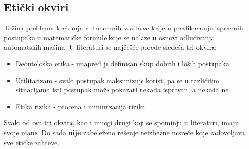 \documentclass[a4paper]{article}
\begin{document}
\subsection{Etički okviri}
\label{subsec:Etički okviri}
Težina problema kreiranja autonomnih vozila se krije u preslikavanju ispravnih postupaka u matematičke formule koje se nalaze u osnovi odlučivanja automatskih mašina. U literaturi se najčešće porede sledeća tri okvira:
\begin{itemize}
 \item {Deontološka etika - unapred je definisan skup dobrih i loših postupaka}
 \item {Utilitarizam - svaki postupak maksimizuje korist, pa se u različitim              situacijama isti postupak može pokazati nekada ispravan, a nekada ne }
 \item {Etika rizika - procena i minimizacija rizika}
\end{itemize}
Svaki od ova tri okvira, kao i mnogi drugi koji se spominju u literaturi, imaju svoje mane. Do sada \textbf{nije} zabeleženo rešenje neizbežne nesreće koje zadovoljava sve etičke zahteve. \cite{trolley_problem}
\end{document}
